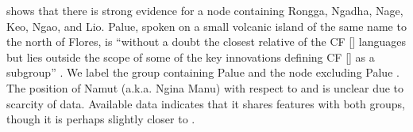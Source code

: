 \citet{Elias2018} shows that there is strong evidence for a node
containing Rongga, Ngadha, Nage, Keo, Nga{\Q}o, and Lio.
Palu{\Q}e, spoken on a small volcanic island of the same name
to the north of Flores,
is “without a doubt the closest relative of the CF [] languages but lies outside the scope of some of the
key innovations defining CF [] as a subgroup” \citep[85]{Elias2018}.
We label the group containing Palu{\Q}e 
and the node excluding Palu{\Q}e .
The position of Namut (a.k.a.
Ngina Manu) with respect to 
and  is unclear due to scarcity of data.
Available data indicates that it shares features
with both groups, though it is perhaps slightly closer to .

